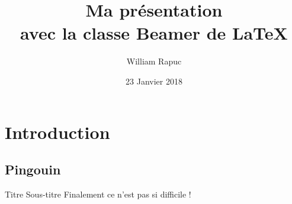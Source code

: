 \documentclass[usenames,dvipsnames, 12pt]{beamer}
\title{Ma présentation \\avec la classe Beamer de \LaTeX}
\author{William Rapuc}
\institute{EDYTEM}
\date{23 Janvier 2018}
\begin{document}
\section{Introduction}
\subsection{Pingouin} %

 \begin{frame}
 \titlepage
 \end{frame}
 \begin{frame}{Titre }{Sous-titre}
  Finalement ce n'est pas si difficile !
 
 	\end{frame}
\end{document}
